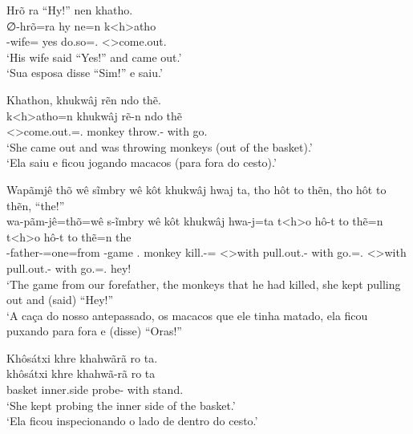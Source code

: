 \documentclass[output=paper,
modfonts,nonflat
]{langsci/langscibook}
\begin{document}
\ea  Hrõ ra ``Hy!'' nen khatho. \\[.3em]
\gll ∅-hrõ=ra           hy  ne=n             k<h>atho               \\
     \Third-wife=\Nom{} yes do.so=\AAnd.\Ss{} <\Third>come.out.\Sg{} \\
\glt `His wife said ``Yes!'' and came out.' \\
     `Sua esposa disse ``Sim!'' e saiu.' \\
\z

\ea  Khathon, khukwâj rẽn ndo thẽ. \\[.3em]
\gll k<h>atho=n                      khukwâj rẽ-n              ndo  thẽ      \\
     <\Third>come.out.\Sg=\AAnd.\Ss{} monkey  throw.\Pl-\Nmlz{} with go.\Sg{} \\
\glt `She came out and was throwing monkeys (out of the basket).' \\
     `Ela saiu e ficou jogando macacos (para fora do cesto).' \\
\z

\ea  Wapãmjê thõ wê sĩmbry wê kôt khukwâj hwaj ta, tho hôt to thẽn, tho hôt to thẽn, ``the!'' \\[.3em]
\gll wa-pãm-jê=thõ=wê                  s-ĩmbry     wê     kôt           khukwâj hwa-j=ta                t<h>o        hô-t                 to   thẽ=n             t<h>o        hô-t                 to   thẽ=n             the   \\
     \First\Incl-father-\Pl{}=one=from \Third-game \Cop{} \Third.\Erg{} monkey  kill.\Pl-\Nmlz{}=\Det{} <\Third>with pull.out.\Pl-\Nmlz{} with go.\Sg=\AAnd.\Ss{} <\Third>with pull.out.\Pl-\Nmlz{} with go.\Sg=\AAnd.\Ss{} hey! \\
\glt `The game from our forefather, the monkeys that he had killed, she kept pulling out and (said) ``Hey!'' \\
     `A caça do nosso antepassado, os macacos que ele tinha matado, ela ficou puxando para fora e (disse) ``Oras!'' \\
\label{exe:relcla2}
\z

\ea  Khôsátxi khre khahwãrã ro ta. \\[.3em]
\gll khôsátxi khre       khahwã-rã     ro   ta          \\
     basket   inner.side probe-\Nmlz{} with stand.\Sg{} \\
\glt `She kept probing the inner side of the basket.' \\
     `Ela ficou inspecionando o lado de dentro do cesto.' \\
\z
\end{document}
